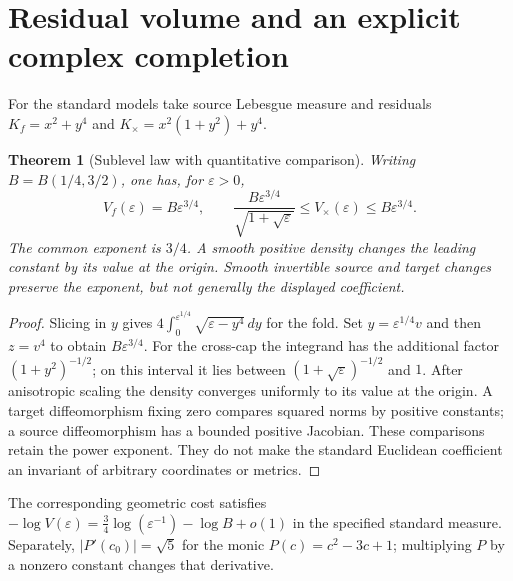 \documentclass[11pt]{article}
\theoremstyle{readable}
\newtheorem{theorem}{Theorem}[section]
\theoremstyle{remark}\newtheorem{remark}[theorem]{Remark}
\newcommand{\dd}{\,d}\newcommand{\norm}[1]{\left\lVert#1\right\rVert}
\begin{document}
\section{Residual volume and an explicit complex completion}\label{sec:residual}
For the standard models take source Lebesgue measure and residuals
$K_f=x^2+y^4$ and $K_\times=x^2(1+y^2)+y^4$.
\begin{theorem}[Sublevel law with quantitative comparison]
Writing $B=B(1/4,3/2)$, one has, for $\varepsilon>0$,
\[
 V_f(\varepsilon)=B\varepsilon^{3/4},\qquad
 \frac{B\varepsilon^{3/4}}{\sqrt{1+\sqrt\varepsilon}}
 \leq V_\times(\varepsilon)\leq B\varepsilon^{3/4}.
\]
The common exponent is $3/4$. A smooth positive density changes the leading
constant by its value at the origin. Smooth invertible source and target
changes preserve the exponent, but not generally the displayed coefficient.
\end{theorem}
\begin{proof}
Slicing in $y$ gives
$4\int_0^{\varepsilon^{1/4}}\sqrt{\varepsilon-y^4}\dd y$ for the fold.
Set $y=\varepsilon^{1/4}v$ and then $z=v^4$ to obtain $B\varepsilon^{3/4}$.
For the cross-cap the integrand has the additional factor $(1+y^2)^{-1/2}$;
on this interval it lies between $(1+\sqrt\varepsilon)^{-1/2}$ and $1$.
After anisotropic scaling the density converges uniformly to its value at
the origin. A target diffeomorphism fixing zero compares squared norms by
positive constants; a source diffeomorphism has a bounded positive Jacobian.
These comparisons retain the power exponent. They do not make the standard
Euclidean coefficient an invariant of arbitrary coordinates or metrics.
\end{proof}
The corresponding geometric cost satisfies
$-\log V(\varepsilon)=\tfrac34\log(\varepsilon^{-1})-\log B+o(1)$ in the
specified standard measure. Separately, $|P'(c_0)|=\sqrt5$ for the monic
$P(c)=c^2-3c+1$; multiplying $P$ by a nonzero constant changes that derivative.
\end{document}
